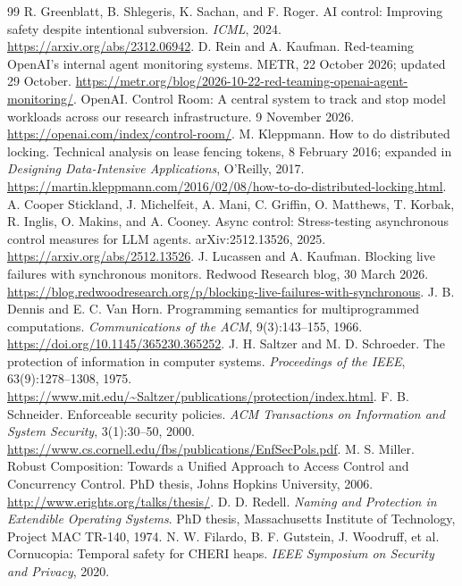 \begingroup\footnotesize
\begin{thebibliography}{99}
 R. Greenblatt, B. Shlegeris, K. Sachan, and F. Roger. AI control: Improving safety despite intentional subversion. \emph{ICML}, 2024. \url{https://arxiv.org/abs/2312.06942}.
 D. Rein and A. Kaufman. Red-teaming OpenAI's internal agent monitoring systems. METR, 22 October 2026; updated 29 October. \url{https://metr.org/blog/2026-10-22-red-teaming-openai-agent-monitoring/}.
 OpenAI. Control Room: A central system to track and stop model workloads across our research infrastructure. 9 November 2026. \url{https://openai.com/index/control-room/}.
 M. Kleppmann. How to do distributed locking. Technical analysis on lease fencing tokens, 8 February 2016; expanded in \emph{Designing Data-Intensive Applications}, O'Reilly, 2017. \url{https://martin.kleppmann.com/2016/02/08/how-to-do-distributed-locking.html}.
 A. Cooper Stickland, J. Michelfeit, A. Mani, C. Griffin, O. Matthews, T. Korbak, R. Inglis, O. Makins, and A. Cooney. Async control: Stress-testing asynchronous control measures for LLM agents. arXiv:2512.13526, 2025. \url{https://arxiv.org/abs/2512.13526}.
 J. Lucassen and A. Kaufman. Blocking live failures with synchronous monitors. Redwood Research blog, 30 March 2026. \url{https://blog.redwoodresearch.org/p/blocking-live-failures-with-synchronous}.
 J. B. Dennis and E. C. Van Horn. Programming semantics for multiprogrammed computations. \emph{Communications of the ACM}, 9(3):143--155, 1966. \url{https://doi.org/10.1145/365230.365252}.
 J. H. Saltzer and M. D. Schroeder. The protection of information in computer systems. \emph{Proceedings of the IEEE}, 63(9):1278--1308, 1975. \url{https://www.mit.edu/~Saltzer/publications/protection/index.html}.
 F. B. Schneider. Enforceable security policies. \emph{ACM Transactions on Information and System Security}, 3(1):30--50, 2000. \url{https://www.cs.cornell.edu/fbs/publications/EnfSecPols.pdf}.
 M. S. Miller. Robust Composition: Towards a Unified Approach to Access Control and Concurrency Control. PhD thesis, Johns Hopkins University, 2006. \url{http://www.erights.org/talks/thesis/}.
 D. D. Redell. \emph{Naming and Protection in Extendible Operating Systems}. PhD thesis, Massachusetts Institute of Technology, Project MAC TR-140, 1974.
 N. W. Filardo, B. F. Gutstein, J. Woodruff, et al. Cornucopia: Temporal safety for CHERI heaps. \emph{IEEE Symposium on Security and Privacy}, 2020.

\end{thebibliography}
